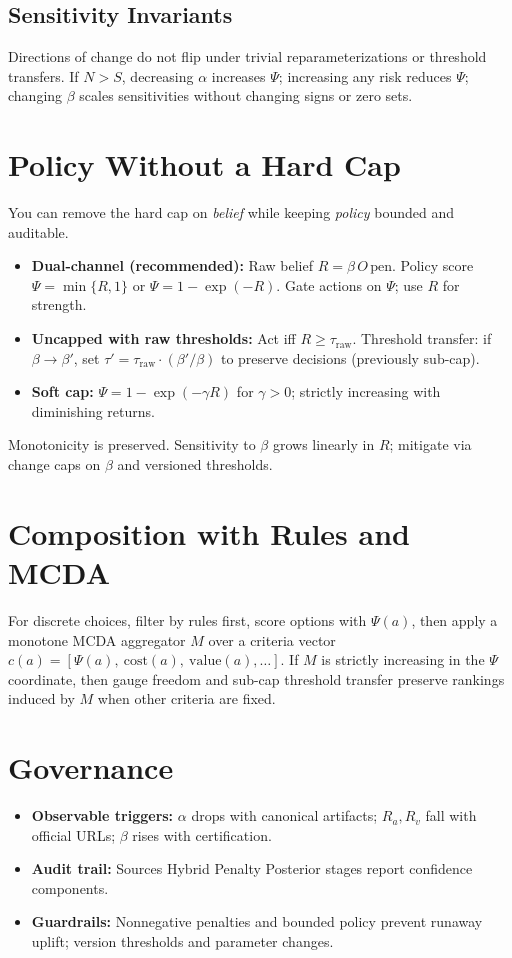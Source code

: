 \documentclass[12pt,a4paper]{article}
\begin{document}
\subsection{Sensitivity Invariants}
Directions of change do not flip under trivial reparameterizations or threshold transfers. If $N>S$, decreasing $\alpha$ increases $\Psi$; increasing any risk reduces $\Psi$; changing $\beta$ scales sensitivities without changing signs or zero sets.

\section{Policy Without a Hard Cap}
You can remove the hard cap on \emph{belief} while keeping \emph{policy} bounded and auditable.
\begin{itemize}[leftmargin=*]
  \item \textbf{Dual-channel (recommended):} Raw belief $R = \beta\,O\,\mathrm{pen}$. Policy score $\Psi = \min\{R,1\}$ or $\Psi = 1-\exp(-R)$. Gate actions on $\Psi$; use $R$ for strength.
  \item \textbf{Uncapped with raw thresholds:} Act iff $R\ge \tau_{\text{raw}}$. Threshold transfer: if $\beta\to\beta'$, set $\tau' = \tau_{\text{raw}}\cdot(\beta'/\beta)$ to preserve decisions (previously sub-cap).
  \item \textbf{Soft cap:} $\Psi = 1-\exp(-\gamma R)$ for $\gamma>0$; strictly increasing with diminishing returns.
\end{itemize}
Monotonicity is preserved. Sensitivity to $\beta$ grows linearly in $R$; mitigate via change caps on $\beta$ and versioned thresholds.

\section{Composition with Rules and MCDA}
For discrete choices, filter by rules first, score options with $\Psi(a)$, then apply a monotone MCDA aggregator $M$ over a criteria vector $c(a)=[\Psi(a),\ \text{cost}(a),\ \text{value}(a),\ldots]$. If $M$ is strictly increasing in the $\Psi$ coordinate, then gauge freedom and sub-cap threshold transfer preserve rankings induced by $M$ when other criteria are fixed.

\section{Governance}
\begin{itemize}[leftmargin=*]
  \item \textbf{Observable triggers:} $\alpha$ drops with canonical artifacts; $R_a,R_v$ fall with official URLs; $\beta$ rises with certification.
  \item \textbf{Audit trail:} Sources \textrightarrow{} Hybrid \textrightarrow{} Penalty \textrightarrow{} Posterior stages report confidence components.
  \item \textbf{Guardrails:} Nonnegative penalties and bounded policy prevent runaway uplift; version thresholds and parameter changes.
\end{itemize}
\end{document}

